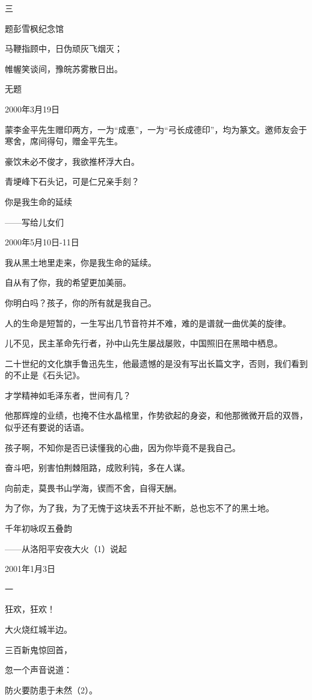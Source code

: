 \documentclass[../../dazhuan.tex]{subfiles}
\begin{document}
三

题彭雪枫纪念馆

马鞭指顾中，日伪顽灰飞烟灭；

帷幄笑谈间，豫皖苏雾散日出。



无题

2000年3月19日

蒙李金平先生赠印两方，一为“成悳”，一为“弓长成德印”，均为篆文。邀师友会于寒舍，席间得句，赠金平先生。

豪饮未必不俊才，我欲推杯浮大白。

青埂峰下石头记，可是仁兄亲手刻？



你是我生命的延续

——写给儿女们

2000年5月10日-11日

我从黑土地里走来，你是我生命的延续。

自从有了你，我的希望更加美丽。

你明白吗？孩子，你的所有就是我自己。

人的生命是短暂的，一生写出几节音符并不难，难的是谱就一曲优美的旋律。

儿不见，民主革命先行者，孙中山先生屡战屡败，中国照旧在黑暗中栖息。

二十世纪的文化旗手鲁迅先生，他最遗憾的是没有写出长篇文字，否则，我们看到的不止是《石头记》。

才学精神如毛泽东者，世间有几？

他那辉煌的业绩，也掩不住水晶棺里，作势欲起的身姿，和他那微微开启的双唇，似乎还有要说的话语。

孩子啊，不知你是否已读懂我的心曲，因为你毕竟不是我自己。

奋斗吧，别害怕荆棘阻路，成败利钝，多在人谋。

向前走，莫畏书山学海，锲而不舍，自得天酬。

为了你，为了我，为了无愧于这块丢不开扯不断，总也忘不了的黑土地。



千年初咏叹五叠韵

——从洛阳平安夜大火（1）说起

2001年1月3日

一

狂欢，狂欢！

大火烧红城半边。

三百新鬼惊回首，

忽一个声音说道：

防火要防患于未然（2）。
\end{document}
